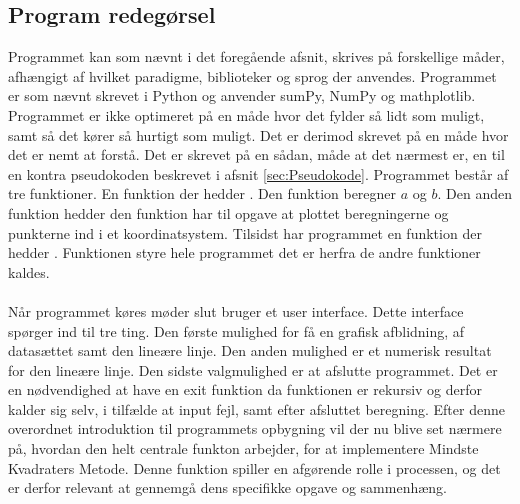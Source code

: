 \subsection{Program redegørsel}
Programmet kan som nævnt i det foregående afsnit, skrives på forskellige måder, afhængigt af hvilket paradigme, biblioteker og sprog der anvendes. Programmet  er som nævnt skrevet i Python og anvender sumPy, NumPy og mathplotlib. Programmet er ikke optimeret på en måde hvor det fylder så lidt som muligt, samt så det kører så hurtigt som muligt. Det er derimod skrevet på en måde hvor det er nemt at forstå. Det er skrevet på en sådan, måde at det nærmest er, en til en kontra pseudokoden beskrevet i afsnit \ref{sec:Pseudokode}. Programmet består af tre funktioner. En funktion der hedder . Den funktion beregner $a$ og $b$. Den anden funktion hedder  den funktion har til opgave at plottet beregningerne og punkterne ind i et koordinatsystem. Tilsidst har programmet en funktion der hedder . Funktionen  styre hele programmet det er herfra de andre funktioner kaldes.  \\\\ Når programmet køres møder slut bruger et user interface. Dette interface spørger ind til tre ting. Den første mulighed for få en grafisk afblidning, af datasættet samt den lineære linje. Den anden mulighed er et numerisk resultat for den lineære linje. Den sidste valgmulighed er at afslutte programmet. Det er en nødvendighed at have en exit funktion da funktionen  er rekursiv og derfor kalder sig selv, i tilfælde at input fejl, samt efter afsluttet beregning. Efter denne overordnet introduktion til programmets opbygning vil der nu blive set nærmere på, hvordan den helt centrale funkton arbejder, for at implementere Mindste Kvadraters Metode. Denne funktion spiller en afgørende rolle i processen, og det er derfor relevant at gennemgå dens specifikke opgave og sammenhæng. 

